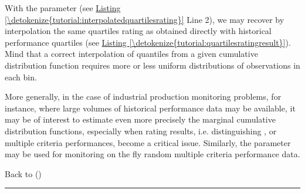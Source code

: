 \documentclass[a4paper,12pt,english]{sphinxhowto}
\begin{document}
With the  parameter (see \hyperref[\detokenize{tutorial:interpolatedquartilesrating}]{Listing \ref{\detokenize{tutorial:interpolatedquartilesrating}}} Line 2), we may recover by interpolation the same quartiles rating as obtained directly with historical performance quartiles (see \hyperref[\detokenize{tutorial:quartilesratingresult}]{Listing \ref{\detokenize{tutorial:quartilesratingresult}}}). Mind that a correct interpolation of quantiles from a given cumulative distribution function requires more or less uniform distributions of observations in each bin.

More generally, in the case of industrial production monitoring problems, for instance, where large volumes of historical performance data may be available, it may be of interest to estimate even more precisely the marginal cumulative distribution functions, especially when  rating results, i.e. distinguishing , or  multiple criteria performances, become a critical issue. Similarly, the  parameter may be used for monitoring on the fly  random multiple criteria performance data.

Back to {\hyperref[\detokenize{tutorial:tutorial-label}]{}} ()


\bigskip\hrule\bigskip
\end{document}
